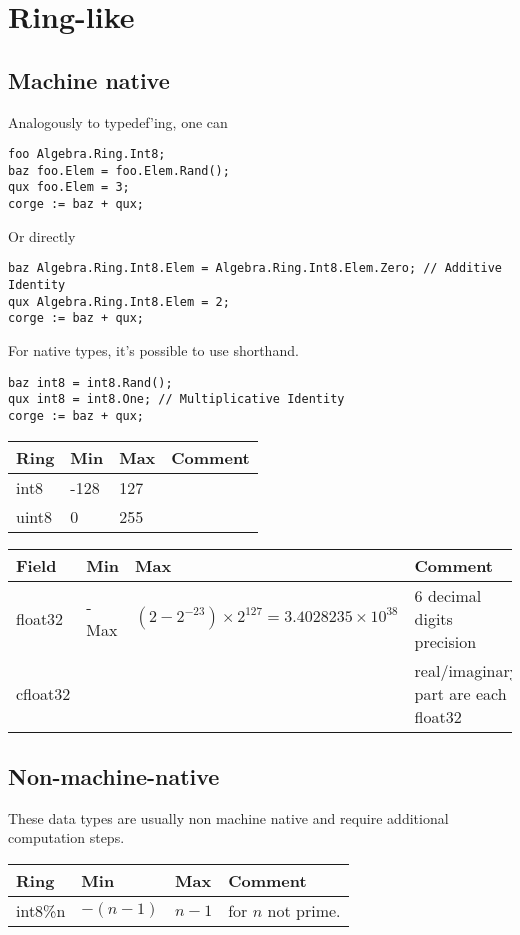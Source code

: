 \documentclass{amsbook}
\begin{document}
\section{Ring-like}

\subsection{Machine native}
Analogously to typedef'ing, one can
\begin{verbatim}
foo Algebra.Ring.Int8;
baz foo.Elem = foo.Elem.Rand();
qux foo.Elem = 3;
corge := baz + qux;
\end{verbatim}

Or directly

\begin{verbatim}
baz Algebra.Ring.Int8.Elem = Algebra.Ring.Int8.Elem.Zero; // Additive Identity
qux Algebra.Ring.Int8.Elem = 2;
corge := baz + qux;
\end{verbatim}

For native types, it's possible to use shorthand.
\begin{verbatim}
baz int8 = int8.Rand();
qux int8 = int8.One; // Multiplicative Identity
corge := baz + qux;
\end{verbatim}

\begin{tabular}{l|l|l|l}
  \textbf{Ring} & \textbf{Min} & \textbf{Max} & \textbf{Comment}\\
  \hline
  int8 &  -128 & 127 & \\
  uint8 & 0 & 255 & \\
\end{tabular}

\begin{tabular}{l|l|l|l}
  \textbf{Field} & \textbf{Min} & \textbf{Max} & \textbf{Comment}\\
  \hline
  float32 & -Max & $(2-2^{-23})\times 2^{127}=3.4028235\times 10^{38}$ & 6 decimal digits precision\\
  cfloat32 & & & real/imaginary part are each float32  
\end{tabular}


\subsection{Non-machine-native}
These data types are usually non machine native and require additional computation steps.

\begin{tabular}{l|l|l|l}
  \textbf{Ring} & \textbf{Min} & \textbf{Max} & \textbf{Comment}\\
  \hline
  int8\%n &  $-(n-1)$ & $n-1$ & for $n$ not prime. \\
\end{tabular}
\end{document}
